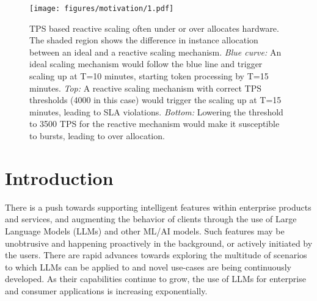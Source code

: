 \begin{figure}[t]
    \centering
\texttt{[image: figures/motivation/1.pdf]}
    \caption{TPS based reactive scaling often under or over allocates hardware. The shaded region shows the difference in instance allocation between an ideal and a reactive scaling mechanism. \textit{Blue curve:} An ideal scaling mechanism would follow the blue line and trigger scaling up at T=10 minutes, starting token processing by T=15 minutes. \textit{Top: } A reactive scaling mechanism with correct TPS thresholds (4000 in this case) would trigger the scaling up at T=15 minutes, leading to SLA violations. \textit{Bottom: } Lowering the threshold to 3500 TPS for the reactive mechanism would make it susceptible to bursts, leading to over allocation.}
    \label{fig:ideal_scaling}
\end{figure}
\section{Introduction }\label{sec:intro}

There is a push towards supporting intelligent features within enterprise products and services, and augmenting the behavior of clients through the use of Large Language Models (LLMs) and other ML/AI models. Such features may be unobtrusive and happening proactively in the background, or actively initiated by the users. There are rapid advances towards exploring the multitude of scenarios to which LLMs can be applied to and novel use-cases are being continuously developed. As their capabilities continue to grow, the use of LLMs for enterprise and consumer applications is increasing exponentially.


